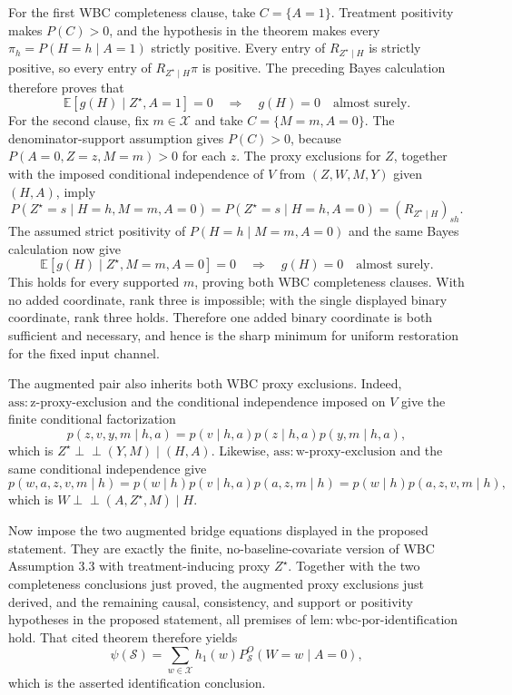 For the first WBC completeness clause, take \(C=\{A=1\}\). Treatment positivity makes \(P(C)>0\), and the hypothesis in the theorem makes every \(\pi_h=P(H=h\mid A=1)\) strictly positive. Every entry of \(R_{Z^{\star}\mid H}\) is strictly positive, so every entry of \(R_{Z^{\star}\mid H}\pi\) is positive. The preceding Bayes calculation therefore proves that
\[
 \mathbb E[g(H)\mid Z^{\star},A=1]=0\quad\Longrightarrow\quad g(H)=0
 \quad\text{almost surely}.
\]
For the second clause, fix \(m\in\mathcal X\) and take \(C=\{M=m,A=0\}\). The denominator-support assumption gives \(P(C)>0\), because \(P(A=0,Z=z,M=m)>0\) for each \(z\). The proxy exclusions for \(Z\), together with the imposed conditional independence of \(V\) from \((Z,W,M,Y)\) given \((H,A)\), imply
\[
 P(Z^{\star}=s\mid H=h,M=m,A=0)
 =P(Z^{\star}=s\mid H=h,A=0)
 =(R_{Z^{\star}\mid H})_{sh}.
\]
The assumed strict positivity of \(P(H=h\mid M=m,A=0)\) and the same Bayes calculation now give
\[
 \mathbb E[g(H)\mid Z^{\star},M=m,A=0]=0
 \quad\Longrightarrow\quad g(H)=0
 \quad\text{almost surely}.
\]
This holds for every supported \(m\), proving both WBC completeness clauses. With no added coordinate, rank three is impossible; with the single displayed binary coordinate, rank three holds. Therefore one added binary coordinate is both sufficient and necessary, and hence is the sharp minimum for uniform restoration for the fixed input channel.

The augmented pair also inherits both WBC proxy exclusions. Indeed, \(\mathrm{ass{:}z\text{-}proxy\text{-}exclusion}\) and the conditional independence imposed on \(V\) give the finite conditional factorization
\[
 p(z,v,y,m\mid h,a)
 =p(v\mid h,a)p(z\mid h,a)p(y,m\mid h,a),
\]
which is \(Z^{\star}\mathbin{\perp\!\!\!\perp}(Y,M)\mid(H,A)\). Likewise, \(\mathrm{ass{:}w\text{-}proxy\text{-}exclusion}\) and the same conditional independence give
\[
 p(w,a,z,v,m\mid h)
 =p(w\mid h)p(v\mid h,a)p(a,z,m\mid h)
 =p(w\mid h)p(a,z,v,m\mid h),
\]
which is \(W\mathbin{\perp\!\!\!\perp}(A,Z^{\star},M)\mid H\).

Now impose the two augmented bridge equations displayed in the proposed statement. They are exactly the finite, no-baseline-covariate version of WBC Assumption 3.3 with treatment-inducing proxy \(Z^{\star}\). Together with the two completeness conclusions just proved, the augmented proxy exclusions just derived, and the remaining causal, consistency, and support or positivity hypotheses in the proposed statement, all premises of \(\mathrm{lem{:}wbc\text{-}por\text{-}identification}\) hold. That cited theorem therefore yields
\[
 \psi(\mathcal S)
 =\sum_{w\in\mathcal X}h_1(w)P_{\mathcal S}^O(W=w\mid A=0),
\]
which is the asserted identification conclusion.

